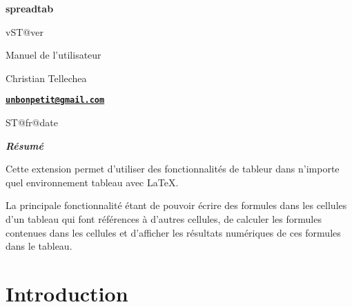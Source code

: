 \documentclass[a4paper,10pt]{article}
\newcommand\ST{\textsf{spreadtab}\xspace}
\begin{document}
\parindent0pt\pagestyle{fancy}\STsetdecimalsep{,}
\begin{titlepage}
	\null\par\vfill
	\begin{center}
		\begin{minipage}{0.75\linewidth}
			\begin{center}
				\Huge\bfseries\ST\par\vspace{5pt}
				\small v\csname ST@ver\endcsname\par\vspace{35pt}
				\normalsize Manuel de l'utilisateur
			\end{center}
		\end{minipage}
	\end{center}
	\vspace{1cm}
	\begin{center}
		Christian {\sc Tellechea}\par\small
		\href{mailto:unbonpetit@gmail.com}{\texttt{\textbf{unbonpetit@gmail.com}}}\par\vspace{5pt}
		\csname ST@fr@date\endcsname
	\end{center}
	\vfill
	\begin{center}
		\begin{minipage}{0.8\linewidth}
			\noindent\hrulefill\par
			\hfill\textbf{\textit{Résumé}}\hfill{}\medskip\par\footnotesize
				Cette extension permet d'utiliser des fonctionnalités de tableur dans n'importe quel environnement \og tableau\fg{} avec \LaTeX{}.\par\smallskip
				La principale fonctionnalité étant de pouvoir écrire des formules dans les cellules d'un tableau qui font références à d'autres cellules, de calculer les formules contenues dans les cellules et d'afficher les résultats numériques de ces formules dans le tableau.\par
			\hrulefill
		\end{minipage}
	\end{center}
	\vfill{}
\end{titlepage}

\tableofcontents\newpage
\parskip\medskipamount
\section{Introduction}
\end{document}

